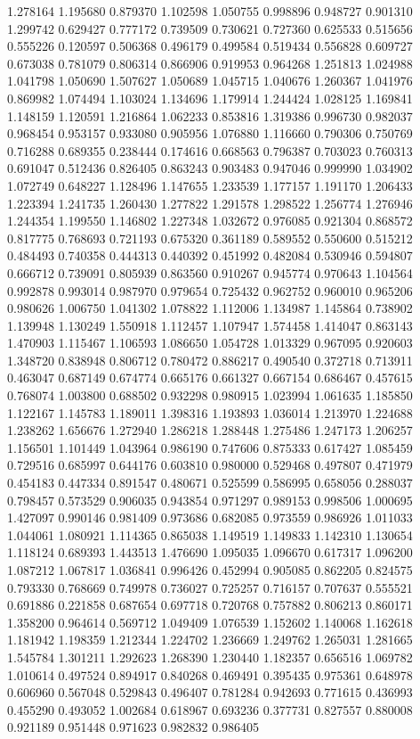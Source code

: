 1.278164
1.195680
0.879370
1.102598
1.050755
0.998896
0.948727
0.901310
1.299742
0.629427
0.777172
0.739509
0.730621
0.727360
0.625533
0.515656
0.555226
0.120597
0.506368
0.496179
0.499584
0.519434
0.556828
0.609727
0.673038
0.781079
0.806314
0.866906
0.919953
0.964268
1.251813
1.024988
1.041798
1.050690
1.507627
1.050689
1.045715
1.040676
1.260367
1.041976
0.869982
1.074494
1.103024
1.134696
1.179914
1.244424
1.028125
1.169841
1.148159
1.120591
1.216864
1.062233
0.853816
1.319386
0.996730
0.982037
0.968454
0.953157
0.933080
0.905956
1.076880
1.116660
0.790306
0.750769
0.716288
0.689355
0.238444
0.174616
0.668563
0.796387
0.703023
0.760313
0.691047
0.512436
0.826405
0.863243
0.903483
0.947046
0.999990
1.034902
1.072749
0.648227
1.128496
1.147655
1.233539
1.177157
1.191170
1.206433
1.223394
1.241735
1.260430
1.277822
1.291578
1.298522
1.256774
1.276946
1.244354
1.199550
1.146802
1.227348
1.032672
0.976085
0.921304
0.868572
0.817775
0.768693
0.721193
0.675320
0.361189
0.589552
0.550600
0.515212
0.484493
0.740358
0.444313
0.440392
0.451992
0.482084
0.530946
0.594807
0.666712
0.739091
0.805939
0.863560
0.910267
0.945774
0.970643
1.104564
0.992878
0.993014
0.987970
0.979654
0.725432
0.962752
0.960010
0.965206
0.980626
1.006750
1.041302
1.078822
1.112006
1.134987
1.145864
0.738902
1.139948
1.130249
1.550918
1.112457
1.107947
1.574458
1.414047
0.863143
1.470903
1.115467
1.106593
1.086650
1.054728
1.013329
0.967095
0.920603
1.348720
0.838948
0.806712
0.780472
0.886217
0.490540
0.372718
0.713911
0.463047
0.687149
0.674774
0.665176
0.661327
0.667154
0.686467
0.457615
0.768074
1.003800
0.688502
0.932298
0.980915
1.023994
1.061635
1.185850
1.122167
1.145783
1.189011
1.398316
1.193893
1.036014
1.213970
1.224688
1.238262
1.656676
1.272940
1.286218
1.288448
1.275486
1.247173
1.206257
1.156501
1.101449
1.043964
0.986190
0.747606
0.875333
0.617427
1.085459
0.729516
0.685997
0.644176
0.603810
0.980000
0.529468
0.497807
0.471979
0.454183
0.447334
0.891547
0.480671
0.525599
0.586995
0.658056
0.288037
0.798457
0.573529
0.906035
0.943854
0.971297
0.989153
0.998506
1.000695
1.427097
0.990146
0.981409
0.973686
0.682085
0.973559
0.986926
1.011033
1.044061
1.080921
1.114365
0.865038
1.149519
1.149833
1.142310
1.130654
1.118124
0.689393
1.443513
1.476690
1.095035
1.096670
0.617317
1.096200
1.087212
1.067817
1.036841
0.996426
0.452994
0.905085
0.862205
0.824575
0.793330
0.768669
0.749978
0.736027
0.725257
0.716157
0.707637
0.555521
0.691886
0.221858
0.687654
0.697718
0.720768
0.757882
0.806213
0.860171
1.358200
0.964614
0.569712
1.049409
1.076539
1.152602
1.140068
1.162618
1.181942
1.198359
1.212344
1.224702
1.236669
1.249762
1.265031
1.281665
1.545784
1.301211
1.292623
1.268390
1.230440
1.182357
0.656516
1.069782
1.010614
0.497524
0.894917
0.840268
0.469491
0.395435
0.975361
0.648978
0.606960
0.567048
0.529843
0.496407
0.781284
0.942693
0.771615
0.436993
0.455290
0.493052
1.002684
0.618967
0.693236
0.377731
0.827557
0.880008
0.921189
0.951448
0.971623
0.982832
0.986405
